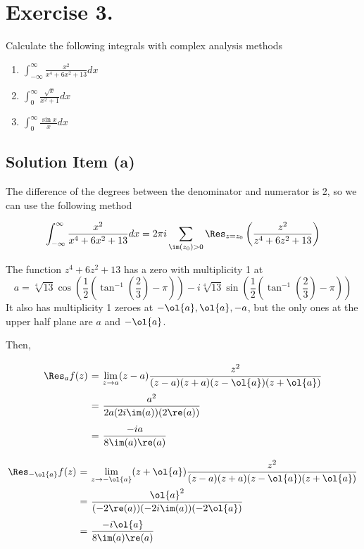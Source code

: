 \section*{Exercise 3.}

Calculate the following integrals with complex analysis methods

\begin{enumerate}[label=(\alph*)]
    \item $\displaystyle \int_{-\infty}^{\infty} \frac{x^2}{x^{4} + 6x^{2}+13} dx$
    \item $\displaystyle \int_{0}^{\infty} \frac{\sqrt{x}}{x^2 + 1} dx$
    \item $\displaystyle \int_{0}^{\infty} \frac{\sin x}{x} dx$
\end{enumerate}

\subsection*{Solution Item (a)}

The difference of the degrees between the denominator and numerator is 2, so we can use the following method

\[ \int_{-\infty}^{\infty} \frac{x^2}{x^{4} + 6x^{2}+13} dx = 2\pi i \sum_{\im(z_0) > 0} \Res_{z = z_0} \left( \frac{z^2}{z^{4} + 6z^{2}+13} \right) \]

The function $z^{4} + 6z^{2}+13$ has a zero with multiplicity 1 at
\[ a = \sqrt[4]{13} \cos\left( \frac{1}{2}\left( \tan^{-1}\left( \frac{2}{3} \right) - \pi  \right) \right) - i\sqrt[4]{13} \sin\left( \frac{1}{2}\left( \tan^{-1}\left( \frac{2}{3} \right) - \pi  \right) \right) \]
It also has multiplicity 1 zeroes at $-\ol{a},\ol{a}, -a$, but the only ones at the upper half plane are $a$ and $-\ol{a}$.

Then,
\[ \everymath{\displaystyle}
\arraycolsep=1.8pt\def\arraystretch{2.5}
\begin{array}{rcl}
    \Res_a f(z) & = & \lim_{z\to a} (z-a)\frac{z^2}{(z-a)(z+a)(z-\ol{a})(z+\ol{a})}\\
    & = & \frac{a^2}{2a(2i \im (a))(2 \re(a))}\\
    & = & \frac{-ia}{8\im(a)\re(a)}
\end{array} \]
\[ \everymath{\displaystyle}
\arraycolsep=1.8pt\def\arraystretch{2.5}
\begin{array}{rcl}
    \Res_{-\ol{a}} f(z) & = & \lim_{z\to -\ol{a}} (z+\ol{a})\frac{z^2}{(z-a)(z+a)(z-\ol{a})(z+\ol{a})}\\
    & = & \frac{\ol{a}^2}{(-2 \re(a))(-2i \im (a))(-2\ol{a})}\\
    & = & \frac{-i\ol{a}}{8\im(a)\re(a)}
\end{array} \]


